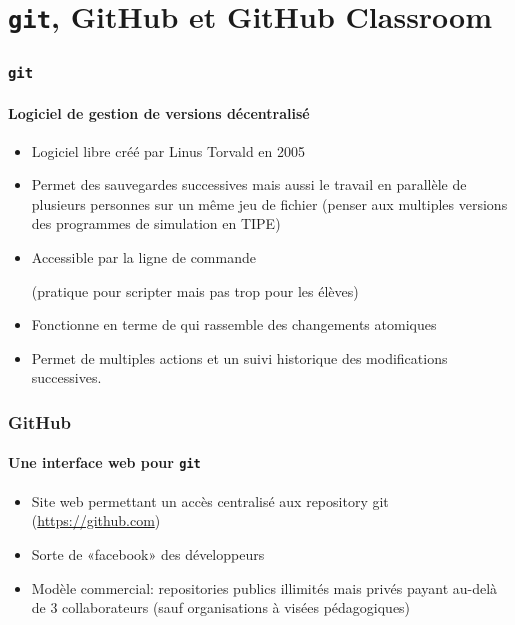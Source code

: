 \section{\texttt{git}, GitHub et GitHub Classroom}

\begin{frame}
\frametitle{\texttt{git}}
\framesubtitle{Logiciel de gestion de versions décentralisé}

\begin{itemize}[<+->]
	\item	 Logiciel libre créé par Linus Torvald en 2005
	\item  Permet des sauvegardes successives mais aussi le travail en parallèle de plusieurs personnes sur un même jeu de fichier (penser aux multiples versions des programmes de simulation en TIPE)
	\item  Accessible par la ligne de commande

	(pratique pour scripter mais pas trop pour les élèves)
	\item  Fonctionne en terme de  qui rassemble des changements atomiques
	\item 	Permet de multiples actions et un suivi historique des modifications successives.

\end{itemize}

\end{frame}


\begin{frame}
\frametitle{GitHub}
\framesubtitle{Une interface web pour \texttt{git}}

\begin{itemize}[<+->]
	\item Site web permettant un accès centralisé aux repository git (\url{https://github.com})



	\item Sorte de «facebook» des développeurs

	\item Modèle commercial: repositories publics illimités mais privés payant au-delà de 3 collaborateurs (sauf organisations à visées pédagogiques)

\end{itemize}

\end{frame}


